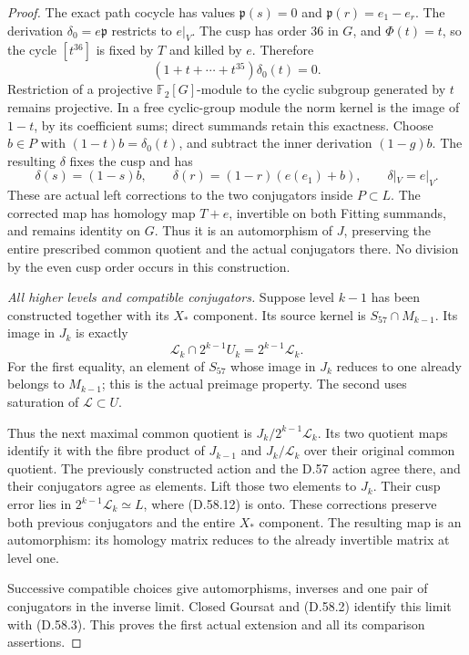 \begin{proof}
The exact path cocycle has values
\(\mathfrak p(s)=0\) and
\(\mathfrak p(r)=e_1-e_r\). The derivation
\(\delta_0=e\mathfrak p\) restricts to \(e|_V\).
The cusp has order 36 in \(G\), and \(\Phi(t)=t\),
so the cycle \([t^{36}]\) is fixed by \(T\) and
killed by \(e\). Therefore
\[
           (1+t+\cdots+t^{35})\delta_0(t)=0.
 \tag{D.58.14}
\]
Restriction of a projective \(\mathbb F_2[G]\)-module
to the cyclic subgroup generated by \(t\) remains
projective. In a free cyclic-group module the norm
kernel is the image of \(1-t\), by its coefficient
sums; direct summands retain this exactness.
Choose \(b\in P\) with
\((1-t)b=\delta_0(t)\), and subtract the inner
derivation \((1-g)b\). The resulting \(\delta\)
fixes the cusp and has
\[
 \delta(s)=(1-s)b,\qquad
 \delta(r)=(1-r)(e(e_1)+b),\qquad
 \delta|_V=e|_V.
 \tag{D.58.15}
\]
These are actual left corrections to the two
conjugators inside \(P\subset L\). The corrected
map has homology map \(T+e\), invertible on both
Fitting summands, and remains identity on \(G\).
Thus it is an automorphism of \(J\), preserving
the entire prescribed common quotient and the
actual conjugators there. No division by the
even cusp order occurs in this construction.

\emph{All higher levels and compatible conjugators.}
Suppose level \(k-1\) has been constructed together
with its \(X_*\) component. Its source kernel is
\(S_{57}\cap M_{k-1}\). Its image in \(J_k\) is
exactly
\[
 \mathcal L_k\cap2^{k-1}U_k
                       =2^{k-1}\mathcal L_k.
 \tag{D.58.16}
\]
For the first equality, an element of \(S_{57}\)
whose image in \(J_k\) reduces to one already
belongs to \(M_{k-1}\); this is the actual
preimage property. The second uses saturation
of \(\mathcal L\subset U\).

Thus the next maximal common quotient is
\(J_k/2^{k-1}\mathcal L_k\). Its two quotient maps
identify it with the fibre product of \(J_{k-1}\)
and \(J_k/\mathcal L_k\) over their original
common quotient. The previously constructed
action and the D.57 action agree there, and
their conjugators agree as elements. Lift those
two elements to \(J_k\). Their cusp error lies
in \(2^{k-1}\mathcal L_k\simeq L\), where
(D.58.12) is onto. These corrections preserve
both previous conjugators and the entire
\(X_*\) component. The resulting map is an
automorphism: its homology matrix reduces to
the already invertible matrix at level one.

Successive compatible choices give automorphisms,
inverses and one pair of conjugators in the
inverse limit. Closed Goursat and (D.58.2)
identify this limit with (D.58.3). This proves
the first actual extension and all its
comparison assertions.


\end{proof}
